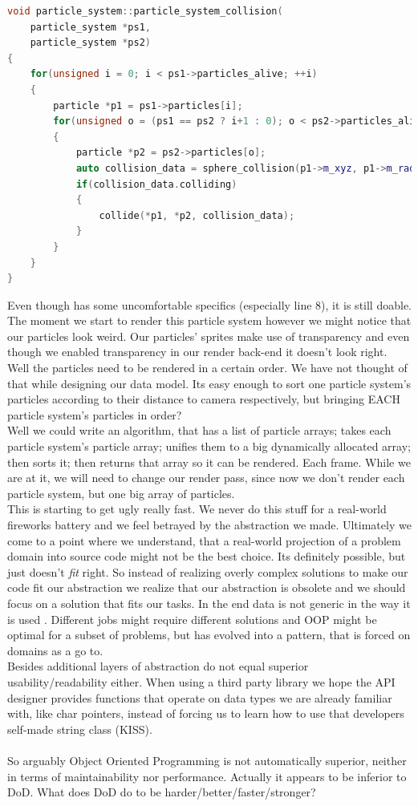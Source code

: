  \begin{lstlisting}[language=C++,name={Example code how OOP could handle collision between different particle systems' particles},label={collision}]
void particle_system::particle_system_collision(
	particle_system *ps1,
	particle_system *ps2)
{
	for(unsigned i = 0; i < ps1->particles_alive; ++i)
	{
		particle *p1 = ps1->particles[i];
		for(unsigned o = (ps1 == ps2 ? i+1 : 0); o < ps2->particles_alive; ++o)
		{
			particle *p2 = ps2->particles[o];
			auto collision_data = sphere_collision(p1->m_xyz, p1->m_radius, p2->m_xyz, p2->m_radius);
			if(collision_data.colliding)
			{
				collide(*p1, *p2, collision_data);
			}
		}
	}
}
\end{lstlisting}
Even though  has some uncomfortable specifics (especially line 8), it is still doable. The moment we start to render this particle system however we might notice that our particles look weird. Our particles' sprites make use of transparency and even though we enabled transparency in our render back-end it doesn't look right. Well the particles need to be rendered in a certain order. We have not thought of that while designing our data model. Its easy enough to sort one particle system's particles according to their distance to camera respectively, but bringing EACH particle system's particles in order?\\
Well we could write an algorithm, that has a list of particle arrays; takes each particle system's particle array; unifies them to a big dynamically allocated array; then sorts it; then returns that array so it can be rendered. Each frame. While we are at it, we will need to change our render pass, since now we don't render each particle system, but one big array of particles.\\
This is starting to get ugly really fast. We never do this stuff for a real-world fireworks battery and we feel betrayed by the abstraction we made. Ultimately we come to a point where we understand, that a real-world projection of a problem domain into source code might not be the best choice. Its definitely possible, but just doesn't \textit{fit} right. So instead of realizing overly complex solutions to make our code fit our abstraction we realize that our abstraction is obsolete and we should focus on a solution that fits our tasks. In the end data is not generic in the way it is used . Different jobs might require different solutions and OOP might be optimal for a subset of problems, but has evolved into a pattern, that is forced on domains as a go to.\\
Besides additional layers of abstraction do not equal superior usability/readability either. When using a third party library we hope the API designer provides functions that operate on data types we are already familiar with, like char pointers, instead of forcing us to learn how to use that developers self-made string class (KISS).\\\\
So arguably Object Oriented Programming is not automatically superior, neither in terms of maintainability nor performance. Actually it appears to be inferior to DoD. What does DoD do to be harder/better/faster/stronger?

